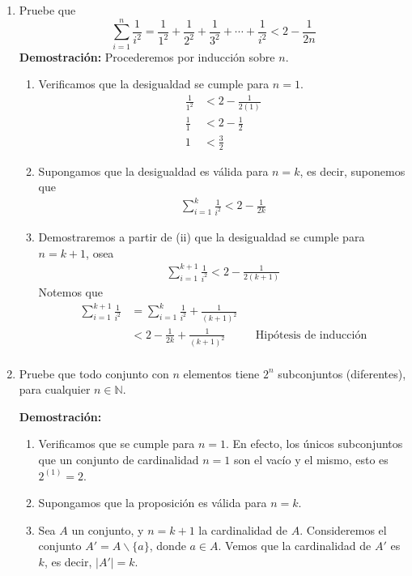 \documentclass[11pt]{article}
\newcommand{\N}{\mathbb{N}}
\begin{document}
\begin{enumerate}
 \item Pruebe que \[\sum_{i=1}^n \frac{1}{i^2} = \frac{1}{1^2}+\frac{1}{2^2}+\frac{1}{3^2}+\cdots + \frac{1}{i^2} < 2-\frac{1}{2n}\]
 \textbf{Demostración:} Procederemos por inducción sobre $n$. \begin{enumerate}[label=\roman*)]
  \item Verificamos que la desigualdad se cumple para $n=1$. \begin{align*}
   \frac{1}{1^2} &< 2 - \frac{1}{2(1)}\\
   \frac{1}{1} &< 2-\frac{1}{2}\\
   1 &< \frac{3}{2}
  \end{align*}
  \item Supongamos que la desigualdad es válida para $n=k$, es decir, suponemos que \begin{align*}
   \sum_{i=1}^k \frac{1}{i^2} < 2-\frac{1}{2k}
  \end{align*}
  \item Demostraremos a partir de (ii) que la desigualdad se cumple para $n=k+1$, osea \begin{align*}
   \sum_{i=1}^{k+1} \frac{1}{i^2} < 2-\frac{1}{2(k+1)}
  \end{align*} Notemos que \begin{align*}
   \sum_{i=1}^{k+1} \frac{1}{i^2} &= \sum_{i=1}^k \frac{1}{i^2} + \frac{1}{(k+1)^2}\\
   &< 2-\frac{1}{2k} + \frac{1}{(k+1)^2} && \text{Hipótesis	de inducción}\\
  \end{align*}
 \end{enumerate}

 \item Pruebe que todo conjunto con $n$ elementos tiene $2^n$ subconjuntos (diferentes), para cualquier $n\in \N$.

 \textbf{Demostración:} \begin{enumerate}[label=\roman*)]
  \item Verificamos que se cumple para $n=1$. En efecto, los únicos subconjuntos que un conjunto de cardinalidad $n=1$ son el vacío y el mismo, esto es $2^{(1)}=2$.
  \item Supongamos que la proposición es válida para $n=k$.
  \item Sea $A$ un conjunto, y $n=k+1$ la cardinalidad de $A$. Consideremos el conjunto $A'=A\backslash\{a\}$, donde $a\in A$. Vemos que la cardinalidad de $A'$ es $k$, es decir, $|A'|=k$.
 \end{enumerate}

\end{enumerate}
\end{document}

